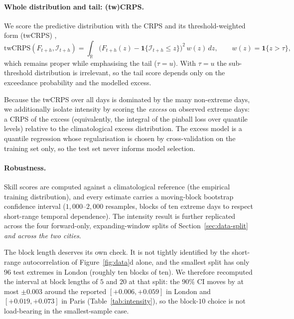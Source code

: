 \documentclass[11pt,a4paper]{article}
\newcommand{\Ind}{\mathcal{I}}                 %
\newcommand{\Real}{\mathbb{R}}
\begin{document}
\paragraph{Whole distribution and tail: (tw)CRPS.} We score the predictive
distribution with the CRPS \citep{gneiting2007scoring} and its
threshold-weighted form (twCRPS) \citep{gneiting2011threshold},
\begin{equation}\label{eq:twcrps}
\mathrm{twCRPS}(F_{t+h},\Ind_{t+h})
= \int_{\Real}\big(F_{t+h}(z)-\mathbf{1}\{\Ind_{t+h}\le z\}\big)^2\,w(z)\,dz,
\qquad w(z)=\mathbf{1}\{z>\tau\},
\end{equation}
which remains proper while emphasising the tail ($\tau=u$). With $\tau=u$ the
sub-threshold distribution is irrelevant, so the tail score depends only on the
exceedance probability and the modelled excess.

Because the twCRPS
over all days is dominated by the many non-extreme days, we additionally isolate
intensity by scoring the \emph{excess} on observed extreme days: a CRPS of the
excess (equivalently, the integral of the pinball loss over quantile levels)
relative to the climatological excess distribution. The excess model is a
quantile regression \citep{koenker1978quantile} whose regularisation is chosen by cross-validation on the
training set only, so the test set never informs model selection.

\paragraph{Robustness.} Skill scores are computed against a climatological
reference (the empirical training distribution), and every estimate carries a
moving-block bootstrap \citep{kunsch1989block} confidence interval ($1{,}000$--$2{,}000$
resamples, blocks of ten extreme days to respect short-range temporal
dependence). The intensity result is further replicated across the four
forward-only, expanding-window splits of Section~\ref{sec:data-split} \emph{and
across the two cities}.

The block length deserves its own check. It is not tightly identified by the
short-range autocorrelation of Figure~\ref{fig:data}d alone, and the smallest
split has only $96$ test extremes in London (roughly ten blocks of ten). We
therefore recomputed the interval at block lengths of $5$ and $20$ at that
split: the $90\%$ CI moves by at most $\pm0.003$ around the reported
$[+0.006,+0.059]$ in London and $[+0.019,+0.073]$ in Paris
(Table~\ref{tab:intensity}), so the block-$10$ choice is not load-bearing in the
smallest-sample case.
\end{document}
